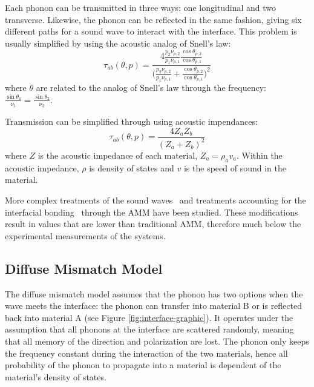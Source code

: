 Each phonon can be transmitted in three ways: one longitudinal and two transverse. Likewise, the phonon can be reflected in the same fashion, giving six different paths for a sound wave to interact with the interface. This problem is usually simplified by using the acoustic analog of Snell’s law:
\begin{equation}
\tau_{ab}(\theta, p) = \frac{4\frac{p_2 \nu_{p, 2}}{p_1 \nu_{p,1}} \frac{\cos{\theta_{p,2}}}{\cos{\theta_{p,1}}}}{\big( \frac{p_2 \nu_{p, 2}}{p_1 \nu_{p,1}}+ \frac{\cos{\theta_{p,2}}}{\cos{\theta_{p,1}}}\big)^2}
\end{equation}
where $\theta$ are related to the analog of Snell's law through the frequency: \(\frac{\sin{\theta_1}}{\nu_1} = \frac{\sin{\theta_2}}{\nu_2}\).

Transmission can be simplified through using acoustic impendances:
\begin{equation}
\tau_{ab}(\theta, p) = \frac{4Z_a Z_b}{(Z_a +Z_b)^2}
\end{equation}
where $Z$ is the acoustic impedance of each material, $Z_a = \rho_a v_a$. Within the acoustic impedance, $\rho$ is density of states and $v$ is the speed of sound in the material. 

More complex treatments of the sound waves~\cite{Prasher2000} and treatments accounting for the interfacial bonding~\cite{Prasher2009} through the AMM have been studied. These modifications result in values that are lower than traditional AMM, therefore much below the experimental measurements of the systems.~\cite{Cahill2006, Stoner1993}

\subsection{Diffuse Mismatch Model}
The diffuse mismatch model assumes that the phonon has two options when the wave meets the interface: the phonon can transfer into material B or is reflected back into material A (see Figure \ref{fig:interface-graphic}). It operates under the assumption that all phonons at the interface are scattered randomly, meaning that all memory of the direction and polarization are lost. The phonon only keeps the frequency constant during the interaction of the two materials, hence all probability of the phonon to propagate into a material is dependent of the material's density of states. 

